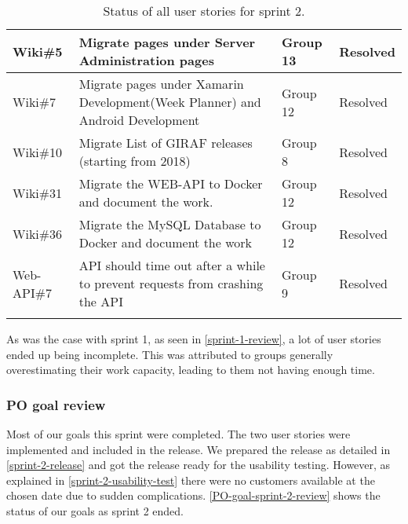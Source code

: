 \begin{longtable}{|p{2.8cm}|p{7cm}|p{1.5cm}|p{1.8cm}|}
    Wiki\#5         & Migrate pages under Server Administration pages                                                                                                                                          & Group 13        & Resolved    \\ \hline
    Wiki\#7         & Migrate pages under Xamarin Development(Week Planner) and Android Development                                                                                                            & Group 12        & Resolved    \\ \hline
    Wiki\#10        & Migrate List of GIRAF releases (starting from 2018)                                                                                                                                      & Group 8         & Resolved    \\ \hline
    Wiki\#31        & Migrate the WEB-API to Docker and document the work.                                                                                                                                     & Group 12        & Resolved    \\ \hline
    Wiki\#36        & Migrate the MySQL Database to Docker and document the work                                                                                                                               & Group 12        & Resolved    \\ \hline
    Web-API\#7      & API should time out after a while to prevent requests from crashing the API                                                                                                              & Group 9         & Resolved    \\ \hline
    \caption{Status of all user stories for sprint 2.}\label{sprint-2-review-table}
\end{longtable}
\noindent
As was the case with sprint 1, as seen in \autoref{sprint-1-review}, a lot of user stories ended up being incomplete.
This was attributed to groups generally overestimating their work capacity, leading to them not having enough time.

\subsubsection{PO goal review}
Most of our goals this sprint were completed.
The two user stories were implemented and included in the release. 
We prepared the release as detailed in \autoref{sprint-2-release} and got the release ready for the usability testing.
However, as explained in \autoref{sprint-2-usability-test} there were no customers available at the chosen date due to sudden complications.
\autoref{PO-goal-sprint-2-review} shows the status of our goals as sprint 2 ended.


